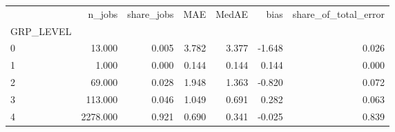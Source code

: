 \begin{tabular}{lrrrrrr}
\toprule
 & n_jobs & share_jobs & MAE & MedAE & bias & share_of_total_error \\
GRP_LEVEL &  &  &  &  &  &  \\
\midrule
0 & 13.000 & 0.005 & 3.782 & 3.377 & -1.648 & 0.026 \\
1 & 1.000 & 0.000 & 0.144 & 0.144 & 0.144 & 0.000 \\
2 & 69.000 & 0.028 & 1.948 & 1.363 & -0.820 & 0.072 \\
3 & 113.000 & 0.046 & 1.049 & 0.691 & 0.282 & 0.063 \\
4 & 2278.000 & 0.921 & 0.690 & 0.341 & -0.025 & 0.839 \\
\bottomrule
\end{tabular}
